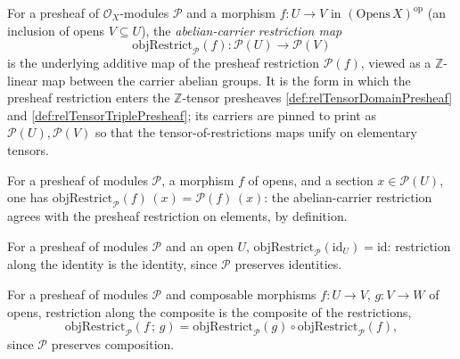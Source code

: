 \begin{definition}

  \label{def:snap_objRestrict}
  For a presheaf of \(\mathcal{O}_X\)-modules \(\mathcal{P}\) and a morphism
  \(f : U \to V\) in \((\mathrm{Opens}\,X)^{\mathrm{op}}\) (an inclusion of opens
  \(V \subseteq U\)), the \emph{abelian-carrier restriction map}
  \[
    \mathrm{objRestrict}_{\mathcal{P}}(f) :
      \mathcal{P}(U) \longrightarrow \mathcal{P}(V)
  \]
  is the underlying additive map of the presheaf restriction \(\mathcal{P}(f)\),
  viewed as a \(\mathbb{Z}\)-linear map between the carrier abelian groups. It is
  the form in which the presheaf restriction enters the \(\mathbb{Z}\)-tensor
  presheaves \cref{def:relTensorDomainPresheaf} and
  \cref{def:relTensorTriplePresheaf}; its carriers are pinned to print as
  \(\mathcal{P}(U), \mathcal{P}(V)\) so that the tensor-of-restrictions maps unify
  on elementary tensors.
\end{definition}

\begin{lemma}

  \label{lem:snap_objRestrict_apply}
  For a presheaf of modules \(\mathcal{P}\), a morphism \(f\) of opens, and a
  section \(x \in \mathcal{P}(U)\), one has
  \(\mathrm{objRestrict}_{\mathcal{P}}(f)\,(x) = \mathcal{P}(f)\,(x)\): the
  abelian-carrier restriction agrees with the presheaf restriction on elements, by
  definition.
\end{lemma}

\begin{lemma}

  \label{lem:snap_objRestrict_id}
  For a presheaf of modules \(\mathcal{P}\) and an open \(U\),
  \(\mathrm{objRestrict}_{\mathcal{P}}(\mathrm{id}_U) = \mathrm{id}\): restriction
  along the identity is the identity, since \(\mathcal{P}\) preserves identities.
\end{lemma}

\begin{lemma}

  \label{lem:snap_objRestrict_comp}
  For a presheaf of modules \(\mathcal{P}\) and composable morphisms \(f : U \to V\),
  \(g : V \to W\) of opens, restriction along the composite is the composite of the
  restrictions,
  \[
    \mathrm{objRestrict}_{\mathcal{P}}(f \,;\, g)
      = \mathrm{objRestrict}_{\mathcal{P}}(g) \circ
        \mathrm{objRestrict}_{\mathcal{P}}(f),
  \]
  since \(\mathcal{P}\) preserves composition.
\end{lemma}


